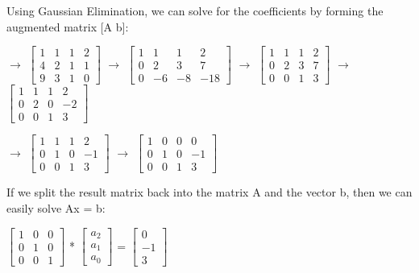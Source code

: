 \documentclass{article}
\begin{document}
Using Gaussian Elimination, we can solve for the coefficients by forming the augmented matrix [A b]: 


\begin{center}
$\rightarrow$
$\begin{bmatrix}
 1&1&1&2\\
 4&2&1&1\\
 9&3&1&0
\end{bmatrix}$
$\rightarrow$
$\begin{bmatrix}
 1&1&1&2\\
 0&2&3&7\\
 0&-6&-8&-18
\end{bmatrix}$
$\rightarrow$
$\begin{bmatrix}
 1&1&1&2\\
 0&2&3&7\\
 0&0&1&3
\end{bmatrix}$
$\rightarrow$
$\begin{bmatrix}
 1&1&1&2\\
 0&2&0&-2\\
 0&0&1&3
\end{bmatrix}$
\end{center}

\begin{center}
$\rightarrow$
$\begin{bmatrix}
 1&1&1&2\\
 0&1&0&-1\\
 0&0&1&3
\end{bmatrix}$
$\rightarrow$
$\begin{bmatrix}
 1&0&0&0\\
 0&1&0&-1\\
 0&0&1&3
\end{bmatrix}$
\end{center}

If we split the result matrix back into the matrix A and the vector b, then we can easily solve Ax = b:

\begin{center}
$\begin{bmatrix}
 1&0&0\\
 0&1&0\\
 0&0&1
\end{bmatrix}$
*
$\begin{bmatrix}
a_2\\
a_1\\
a_0
\end{bmatrix}$
= 
$\begin{bmatrix}
0\\
-1\\
3
\end{bmatrix}$
\end{center}
\end{document}
